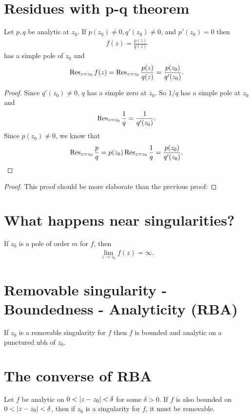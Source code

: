 \documentclass{article}
\theoremstyle{definition}
\newcommand{\f}[2]{\frac{#1}{#2}}
\begin{document}
\section{Residues with p-q theorem}
Let $p,q$ be analytic at $z_0$. If $p(z_0) \neq 0, q'(z_0) \neq 0$, and $p'(z_0) = 0$ then
\begin{align}
f(z) = \f{p(z)}{q(z)}
\end{align}
has a simple pole of $z_0$ and 
\begin{align}
\Res_{z = z_0} f(z) =\Res_{z = z_0}\f{p(z)}{q(z)} = \f{p(z_0)}{q'(z_0)}.
\end{align}
\begin{proof}
	Since $q'(z_0) \neq 0$, $q$ has a simple zero at $z_0$. So $1/q$ has a simple pole at $z_0$ and 
	\begin{align}
	\Res_{z = z_0}\f{1}{q} = \f{1}{q'(z_0)}.
	\end{align}
	Since $p(z_0) \neq 0$, we know that
	\begin{align}
	\Res_{z=z_0}\f{p}{q} = p(z_0)\Res_{z = z_0}\f{1}{q} = \f{p(z_0)}{q'(z_0)}.
	\end{align}
\end{proof}


\begin{proof}
	This proof should be more elaborate than the previous proof: 
\end{proof}

\newpage

\section{What happens near singularities?}

If $z_0$ is a pole of order $m$ for $f$, then 
\begin{align}
\lim_{z \to z_0} f(z) = \infty.
\end{align}


\section{Removable singularity - Boundedness - Analyticity (RBA)}
If $z_0$ is a removable singularity for $f$ then $f$ is bounded and analytic on a punctured nbh of $z_0$.


\section{The converse of RBA}
Let $f$ be analytic on $0 < \abs{z-z_0} < \delta $ for some $\delta > 0$. If $f$ is also bounded on $ 0 < \abs{z-z_0} < \delta$, then if $z_0$ is a singularity for $f$, it must be removable. \\
\end{document}
